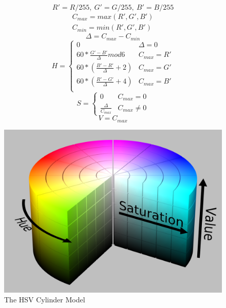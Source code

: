 \documentclass[letterpaper, 10 pt, twoside, conference]{ieeeconf}
\begin{document}
\begin{equation}
  \label{eq:1}
  R' = R/255,\ G' = G/255,\ B' = B/255
\end{equation}
\begin{equation}
  \begin{multlined}
C_{max} = max(R', G', B')\\
C_{min} = min(R', G', B')
  \end{multlined}
\end{equation}
\begin{equation}
  \Delta = C_{max} - C_{min}
\end{equation}
\begin{equation}
   H = \begin{cases} 
            0 & \Delta = 0 \\
   60 * \frac{G'-B'}{\Delta}mod6 & C_{max} = R' \\
     60 * (\frac{B'-R'}{\Delta}+2) & C_{max}=G' \\
     60 * (\frac{R'-G'}{\Delta}+4) & C_{max} = B'\\

         \end{cases}
\end{equation}
\begin{equation}
  S = \begin{cases}
      0 & C_{max} = 0\\
      \frac{\Delta}{C_{max}} & C_{max} \neq 0
  \end{cases}
\end{equation}
\begin{equation}
  V = C_{max}
\end{equation}
\begin{figure}[h]
  \centering
  \includegraphics[width=0.8\columnwidth]{hsv.png}
  \caption{The HSV Cylinder Model}
  \label{Overall1}
\end{figure}
\end{document}
